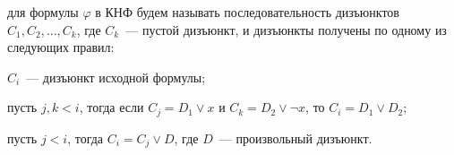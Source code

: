  для формулы $\varphi$ в КНФ будем называть последовательность
дизъюнктов $C_1, C_2, \dots, C_k$, где $C_k$~--- пустой дизъюнкт, и дизъюнкты получены по одному из
следующих правил:
\begin{itemtask}
    \item $C_i$~--- дизъюнкт исходной формулы;
    \item пусть $j, k < i$, тогда если $C_j = D_1 \lor x$ и $C_k = D_2 \lor \neg x$, то $C_i = D_1 \lor
        D_2$;
    \item пусть $j < i$, тогда $C_i = C_j \lor D$, где $D$~--- произвольный дизъюнкт.
\end{itemtask}